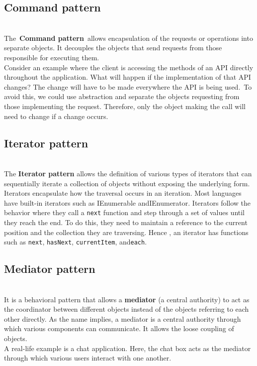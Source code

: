 \subsection{Command pattern}\label{DxL45g0fl9E57Wk4GZZMO}
\\
The~\textbf{Command pattern}~allows encapsulation of the requests or operations into separate objects. It decouples the objects that send requests from those responsible for executing them.
\\
Consider an example where the client is accessing the methods of an API directly throughout the application. What will happen if the implementation of that API changes? The change will have to be made everywhere the API is being used.~To avoid this, we could use abstraction and separate the objects requesting from those implementing the request. Therefore, only the object making the call will need to change if a change occurs.

\subsection{Iterator pattern}\label{yoV97XQWhoDp_gBajKetd}
\\
The \textbf{Iterator pattern} allows the definition of various types of iterators that can sequentially iterate a collection of objects without exposing the underlying form.
\\
Iterators encapsulate how the traversal occurs in an iteration. Most languages have built-in iterators such as IEnumerable andIEnumerator. Iterators follow the behavior where they call a \texttt{next} function and step through a set of values until they reach the end. To do this, they need to maintain a reference to the current position and the collection they are traversing. Hence , an iterator has functions such as \texttt{next}, \texttt{hasNext}, \texttt{currentItem}, and\texttt{each}.

\subsection{Mediator pattern}\label{ZT1Io2XlXrg5iqU_Mn_zZ}
\\
It is a behavioral pattern that allows a \textbf{mediator} (a central authority) to act as the coordinator between different objects instead of the objects referring to each other directly. As the name implies, a mediator is a central authority through which various components can communicate. It allows the loose coupling of objects.
\\
A real-life example is a chat application. Here, the chat box acts as the mediator through which various users interact with one another.

